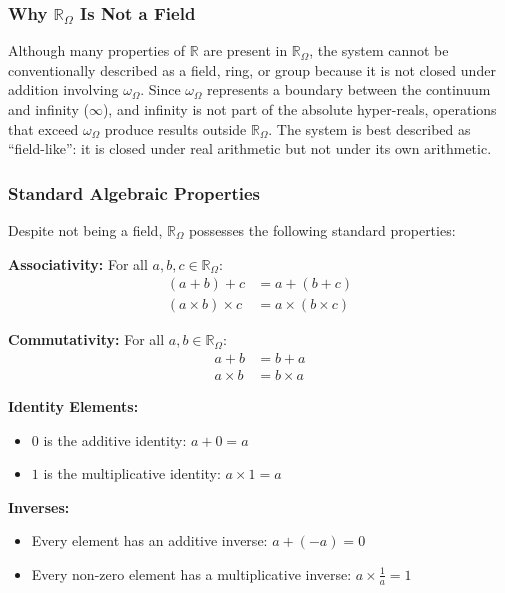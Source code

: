 \documentclass{article}
\begin{document}
\subsubsection{Why $\mathbb{R}_\Omega$ Is Not a Field}

Although many properties of $\mathbb{R}$ are present in $\mathbb{R}_\Omega$, the system cannot be conventionally described as a field, ring, or group because it is not closed under addition involving $\omega_\Omega$. Since $\omega_\Omega$ represents a boundary between the continuum and infinity ($\infty$), and infinity is not part of the absolute hyper-reals, operations that exceed $\omega_\Omega$ produce results outside $\mathbb{R}_\Omega$. The system is best described as ``field-like'': it is closed under real arithmetic but not under its own arithmetic.

\subsubsection{Standard Algebraic Properties}

Despite not being a field, $\mathbb{R}_\Omega$ possesses the following standard properties:

\textbf{Associativity:} For all $a, b, c \in \mathbb{R}_\Omega$:
\begin{align*}
(a + b) + c &= a + (b + c) \\
(a \times b) \times c &= a \times (b \times c)
\end{align*}

\textbf{Commutativity:} For all $a, b \in \mathbb{R}_\Omega$:
\begin{align*}
a + b &= b + a \\
a \times b &= b \times a
\end{align*}

\textbf{Identity Elements:}
\begin{itemize}
\item $0$ is the additive identity: $a + 0 = a$
\item $1$ is the multiplicative identity: $a \times 1 = a$
\end{itemize}

\textbf{Inverses:}
\begin{itemize}
\item Every element has an additive inverse: $a + (-a) = 0$
\item Every non-zero element has a multiplicative inverse: $a \times \frac{1}{a} = 1$
\end{itemize}
\end{document}
